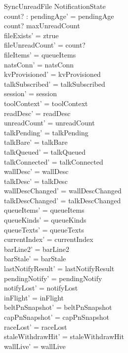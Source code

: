 \documentclass[a4paper,10pt,fleqn]{article}
\begin{document}
\begin{schema}{SyncUnreadFile}
  \Delta NotificationState \\
  count? : \nat
  \where
  pendingAge' = pendingAge \\
  count? \leq maxUnreadCount \\
  fileExists' = ztrue \\
  fileUnreadCount' = count? \\
  fileItems' = queueItems \\
  natsConn' = natsConn \\
  kvProvisioned' = kvProvisioned \\
  talkSubscribed' = talkSubscribed \\
  session' = session \\
  toolContext' = toolContext \\
  readDesc' = readDesc \\
  unreadCount' = unreadCount \\
  talkPending' = talkPending \\
  talkBare' = talkBare \\
  talkQueued' = talkQueued \\
  talkConnected' = talkConnected \\
  wallDesc' = wallDesc \\
  talkDesc' = talkDesc \\
  wallDescChanged' = wallDescChanged \\
  talkDescChanged' = talkDescChanged \\
  queueItems' = queueItems \\
  queueKinds' = queueKinds \\
  queueTexts' = queueTexts \\
  currentIndex' = currentIndex \\
  barLine2' = barLine2 \\
  barStale' = barStale \\
  lastNotifyResult' = lastNotifyResult \\
  pendingNotify' = pendingNotify \\
  notifyLost' = notifyLost \\
  inFlight' = inFlight \\
  beltPnSnapshot' = beltPnSnapshot \\
  capPnSnapshot' = capPnSnapshot \\
  raceLost' = raceLost \\
  staleWithdrawHit' = staleWithdrawHit \\
  wallLive' = wallLive \\

\end{schema}
\end{document}
